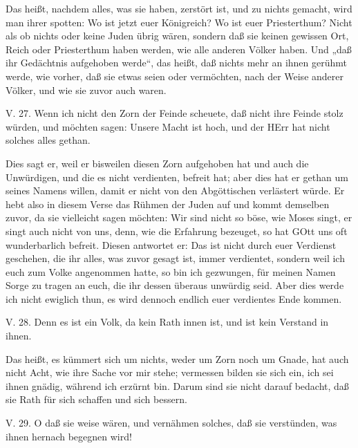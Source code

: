 Das heißt, nachdem alles, was sie haben, zerstört ist, und zu nichts gemacht, wird man ihrer spotten: Wo ist jetzt euer Königreich? Wo ist euer Priesterthum? Nicht als ob nichts oder keine Juden übrig wären, sondern daß sie keinen gewissen Ort, Reich oder Priesterthum haben werden, wie alle anderen Völker haben. Und „daß ihr Gedächtnis aufgehoben werde“, das heißt, daß nichts mehr an ihnen gerühmt werde, wie vorher, daß sie etwas seien oder vermöchten, nach der Weise anderer Völker, und wie sie zuvor auch waren.

\begin{schriftzitat}
V. 27. Wenn ich nicht den Zorn der Feinde scheuete, daß nicht ihre Feinde stolz würden, und möchten sagen: Unsere Macht ist hoch, und der HErr hat nicht solches alles gethan.
\end{schriftzitat}

Dies sagt er, weil er bisweilen diesen Zorn aufgehoben hat und auch die Unwürdigen, und die es nicht verdienten, befreit hat; aber dies hat er gethan um seines Namens willen, damit er nicht von den Abgöttischen verlästert würde. Er hebt also in diesem Verse das Rühmen der Juden auf und kommt demselben zuvor, da sie vielleicht sagen möchten: Wir sind nicht so böse, wie Moses singt, er singt auch nicht von uns, denn, wie die Erfahrung bezeuget, so hat GOtt uns oft wunderbarlich befreit. Diesen antwortet er: Das ist nicht durch euer Verdienst geschehen, die ihr alles, was zuvor gesagt ist, immer verdientet, sondern weil ich euch zum Volke angenommen hatte, so bin ich gezwungen, für meinen Namen Sorge zu tragen an euch, die ihr dessen überaus unwürdig seid. Aber dies werde ich nicht ewiglich thun, es wird dennoch endlich euer verdientes Ende kommen.

\begin{schriftzitat}
V. 28. Denn es ist ein Volk, da kein Rath innen ist, und ist kein Verstand in ihnen.
\end{schriftzitat}

Das heißt, es kümmert sich um nichts, weder um Zorn noch um Gnade, hat auch nicht Acht, wie ihre Sache vor mir stehe; vermessen bilden sie sich ein, ich sei ihnen gnädig, während ich erzürnt bin. Darum sind sie nicht darauf bedacht, daß sie Rath für sich schaffen und sich bessern.

\begin{schriftzitat}
V. 29. O daß sie weise wären, und vernähmen solches, daß sie verstünden, was ihnen hernach begegnen wird!
\end{schriftzitat}

